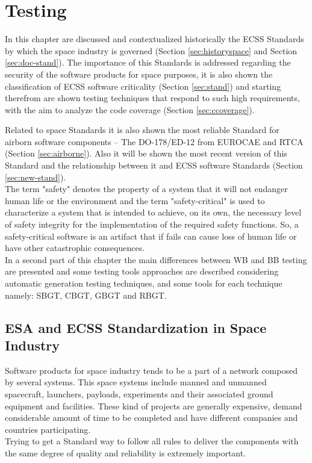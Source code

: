 \chapter{Testing}
In this chapter are discussed and contextualized historically the \ac{ECSS} Standards by which the space industry is governed (Section \ref{sec:historyspace} and Section \ref{sec:doc-stand}).
The importance of this Standards is addressed regarding the security of the software products for space purposes, it is also
shown the classification of \ac{ECSS} software criticality (Section \ref{sec:stand}) and starting therefrom are shown testing techniques that 
respond to such high requirements, with the aim to analyze the code coverage (Section \ref{sec:ccoverage}).

Related to space Standards it is also shown the most reliable Standard for airborn software components -- The DO-178/ED-12 from \ac{EUROCAE} and \ac{RTCA} (Section \ref{sec:airborne}).
Also it will be shown the most recent version of this Standard and the relationship between it and \ac{ECSS} software Standards (Section \ref{sec:new-stand}).\\
The term "safety" denotes the property of a system that it will not endanger human life or the environment and
the term "safety-critical" is used to characterize a
system that is intended to achieve, on its own, the necessary level of safety integrity for the implementation of the required safety functions.
So, a safety-critical software is an artifact that if
fails can cause loss of human life or have other catastrophic consequences.\\

In a second part of this chapter the main differences between \ac{WB} and \ac{BB} testing are presented and
some testing tools approaches are described considering automatic generation testing techniques, and some tools for each technique namely:
\ac{SBGT}, \ac{CBGT}, \ac{GBGT} and
\ac{RBGT}.
\section{ESA and ECSS Standardization in Space Industry}
Software products for space industry tends to be a part of a network composed by several systems. This space systems include manned and unmanned spacecraft,
launchers, payloads, experiments and their associated ground equipment and facilities\cite{Mattiello-FranciscoSanAmbJogCos:2007:BrSoIn}.
These kind of projects are generally  expensive, demand considerable amount of time to be completed and have different companies and countries participating.\\
Trying to get a Standard way to follow all rules to deliver the components with the same degree of quality and reliability is extremely important.\\

